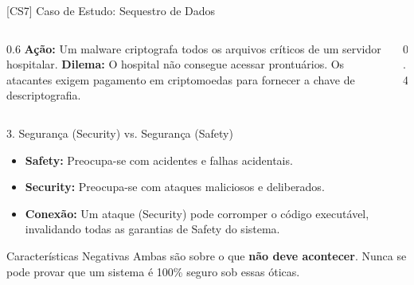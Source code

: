 \documentclass[aspectratio=169]{beamer}
\begin{document}
\begin{frame}{[CS7] Caso de Estudo: Sequestro de Dados}
    \begin{columns}
        \begin{column}{0.6\textwidth}
            \textbf{Ação:} Um malware criptografa todos os arquivos críticos de um servidor hospitalar.
            \vspace{0.3cm}
            \textbf{Dilema:} O hospital não consegue acessar prontuários. Os atacantes exigem pagamento em criptomoedas para fornecer a chave de descriptografia.
        \end{column}
        \begin{column}{0.4\textwidth}
            \centering
        \end{column}
    \end{columns}
\end{frame}

\begin{frame}{3. Segurança (Security) vs. Segurança (Safety)}
    \begin{itemize}
        \item \textbf{Safety:} Preocupa-se com acidentes e falhas acidentais.
        \item \textbf{Security:} Preocupa-se com ataques maliciosos e deliberados.
        \item \textbf{Conexão:} Um ataque (Security) pode corromper o código executável, invalidando todas as garantias de Safety do sistema.
    \end{itemize}
    \begin{block}{Características Negativas}
        Ambas são sobre o que \textbf{não deve acontecer}. Nunca se pode provar que um sistema é 100\% seguro sob essas óticas.
    \end{block}
\end{frame}
\end{document}
